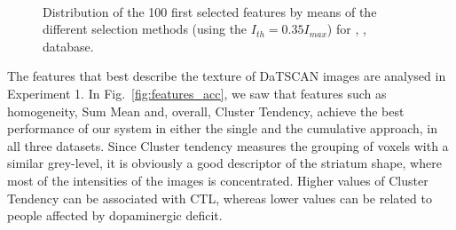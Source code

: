 \begin{figure}
	\centering
	\\
	
	\caption[Distribution of the 100 first selected features by means of the different selection methods.]{Distribution of the 100 first selected features by means of the different selection methods (using the $I_{th} = 0.35 I_{max}$) for \ppmidat{}, \vdlvdat{}{}, \vdlvdat{} database.} 
	\label{fig:fnumber}
\end{figure}

The features that best describe the texture of DaTSCAN images are analysed in Experiment 1. In Fig.~\ref{fig:features_acc}, we saw that features such as homogeneity, Sum Mean and, overall, Cluster Tendency, achieve the best performance of our system in either the single and the cumulative approach, in all three datasets. Since Cluster tendency measures the grouping of voxels with a similar grey-level, it is obviously a good descriptor of the striatum shape, where most of the intensities of the images is concentrated. Higher values of Cluster Tendency can be associated with \ac{CTL}, whereas lower values can be related to people affected by dopaminergic deficit. 

